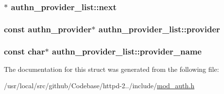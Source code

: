 \subsubsection[{\texorpdfstring{next}{next}}]{$\ast$ authn\+\_\+provider\+\_\+list\+::next}\hypertarget{structauthn__provider__list_a5c85b54f9ef6cd8f7697b6bdce0abfd8}{}\label{structauthn__provider__list_a5c85b54f9ef6cd8f7697b6bdce0abfd8}
\subsubsection[{\texorpdfstring{provider}{provider}}]{\setlength{\rightskip}{0pt plus 5cm}const {\bf authn\+\_\+provider}$\ast$ authn\+\_\+provider\+\_\+list\+::provider}\hypertarget{structauthn__provider__list_aee01f382f2721f7f688e30395b4ead0b}{}\label{structauthn__provider__list_aee01f382f2721f7f688e30395b4ead0b}
\subsubsection[{\texorpdfstring{provider\+\_\+name}{provider_name}}]{\setlength{\rightskip}{0pt plus 5cm}const char$\ast$ authn\+\_\+provider\+\_\+list\+::provider\+\_\+name}\hypertarget{structauthn__provider__list_af37d3481695dc0e80f5f2b237c2baea0}{}\label{structauthn__provider__list_af37d3481695dc0e80f5f2b237c2baea0}


The documentation for this struct was generated from the following file\+:\begin{DoxyCompactItemize}
\item 
/usr/local/src/github/\+Codebase/httpd-\/2../include/\hyperlink{mod__auth_8h}{mod\+\_\+auth.\+h}\end{DoxyCompactItemize}
